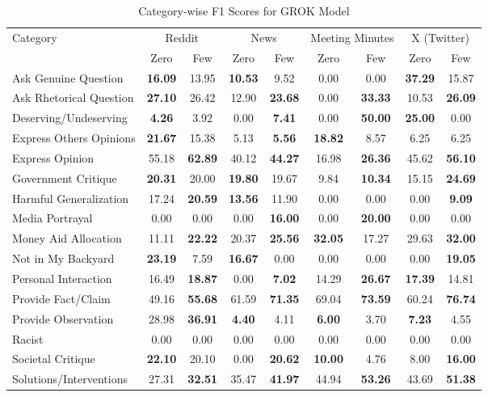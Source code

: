 \begin{table*}[htbp]
\centering
\begin{tabular}{l *{8}{c}}
\toprule
Category & \multicolumn{2}{c}{Reddit} & \multicolumn{2}{c}{News} & \multicolumn{2}{c}{Meeting Minutes} & \multicolumn{2}{c}{X (Twitter)} \\
& Zero & Few & Zero & Few & Zero & Few & Zero & Few \\
\midrule
Ask Genuine Question & \textbf{16.09} & 13.95 & \textbf{10.53} & 9.52 & 0.00 & 0.00 & \textbf{37.29} & 15.87 \\
Ask Rhetorical Question & \textbf{27.10} & 26.42 & 12.90 & \textbf{23.68} & 0.00 & \textbf{33.33} & 10.53 & \textbf{26.09} \\
Deserving/Undeserving & \textbf{4.26} & 3.92 & 0.00 & \textbf{7.41} & 0.00 & \textbf{50.00} & \textbf{25.00} & 0.00 \\
Express Others Opinions & \textbf{21.67} & 15.38 & 5.13 & \textbf{5.56} & \textbf{18.82} & 8.57 & 6.25 & 6.25 \\
Express Opinion & 55.18 & \textbf{62.89} & 40.12 & \textbf{44.27} & 16.98 & \textbf{26.36} & 45.62 & \textbf{56.10} \\
Government Critique & \textbf{20.31} & 20.00 & \textbf{19.80} & 19.67 & 9.84 & \textbf{10.34} & 15.15 & \textbf{24.69} \\
Harmful Generalization & 17.24 & \textbf{20.59} & \textbf{13.56} & 11.90 & 0.00 & 0.00 & 0.00 & \textbf{9.09} \\
Media Portrayal & 0.00 & 0.00 & 0.00 & \textbf{16.00} & 0.00 & \textbf{20.00} & 0.00 & 0.00 \\
Money Aid Allocation & 11.11 & \textbf{22.22} & 20.37 & \textbf{25.56} & \textbf{32.05} & 17.27 & 29.63 & \textbf{32.00} \\
Not in My Backyard & \textbf{23.19} & 7.59 & \textbf{16.67} & 0.00 & 0.00 & 0.00 & 0.00 & \textbf{19.05} \\
Personal Interaction & 16.49 & \textbf{18.87} & 0.00 & \textbf{7.02} & 14.29 & \textbf{26.67} & \textbf{17.39} & 14.81 \\
Provide Fact/Claim & 49.16 & \textbf{55.68} & 61.59 & \textbf{71.35} & 69.04 & \textbf{73.59} & 60.24 & \textbf{76.74} \\
Provide Observation & 28.98 & \textbf{36.91} & \textbf{4.40} & 4.11 & \textbf{6.00} & 3.70 & \textbf{7.23} & 4.55 \\
Racist & 0.00 & 0.00 & 0.00 & 0.00 & 0.00 & 0.00 & 0.00 & 0.00 \\
Societal Critique & \textbf{22.10} & 20.10 & 0.00 & \textbf{20.62} & \textbf{10.00} & 4.76 & 8.00 & \textbf{16.00} \\
Solutions/Interventions & 27.31 & \textbf{32.51} & 35.47 & \textbf{41.97} & 44.94 & \textbf{53.26} & 43.69 & \textbf{51.38} \\
\bottomrule
\end{tabular}
\caption{Category-wise F1 Scores for GROK Model}
\label{tab:grok_category_breakdown}
\end{table*}